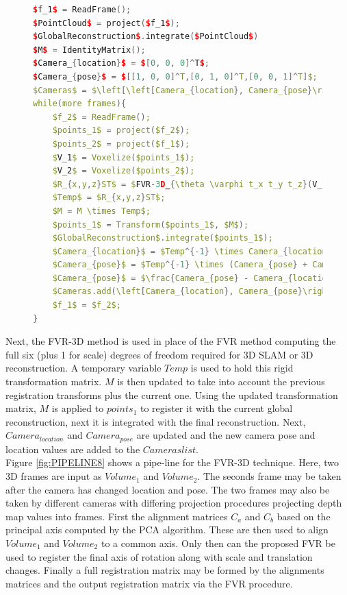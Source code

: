 \begin{figure}
\begin{lstlisting}[language=c++,caption=Phase Correlation Based SLAM Algorithm,label=algorithm:FVR3DSLAM,mathescape,basicstyle=\ttfamily]
$f_1$ = ReadFrame();
$PointCloud$ = project($f_1$);
$GlobalReconstruction$.integrate($PointCloud$)
$M$ = IdentityMatrix();
$Camera_{location}$ = $[0, 0, 0]^T$;
$Camera_{pose}$ = $[[1, 0, 0]^T,[0, 1, 0]^T,[0, 0, 1]^T]$;
$Cameras$ = $\left[\left[Camera_{location}, Camera_{pose}\right] \right]$;
while(more frames){
	$f_2$ = ReadFrame();
	$points_1$ = project($f_2$);
	$points_2$ = project($f_1$);
	$V_1$ = Voxelize($points_1$);
	$V_2$ = Voxelize($points_2$);
	$R_{x,y,z}ST$ = $FVR-3D_{\theta \varphi t_x t_y t_z}(V_1, V_2)$;
	$Temp$ = $R_{x,y,z}ST$;
	$M = M \times Temp$;
	$points_1$ = Transform($points_1$, $M$);
	$GlobalReconstruction$.integrate($points_1$);
	$Camera_{location}$ = $Temp^{-1} \times Camera_{location}$;
	$Camera_{pose}$ = $Temp^{-1} \times (Camera_{pose} + Camera_{location})$;
	$Camera_{pose}$ = $\frac{Camera_{pose} - Camera_{location}}{Camera_{pose} - Camera_{location}}$;
	$Cameras.add(\left[Camera_{location}, Camera_{pose}\right])$;
	$f_1$ = $f_2$;
}
\end{lstlisting}
\end{figure}

Next, the FVR-3D method is used in place of the FVR method computing the full six (plus 1 for scale) degrees of freedom required for 3D SLAM or 3D reconstruction. A temporary variable $Temp$ is used to hold this rigid transformation matrix. $M$ is then updated to take into account the previous registration transforms plus the current one. Using the updated transformation matrix, $M$ is applied to $points_1$ to register it with the current global reconstruction, next it is integrated with the final reconstruction. Next, $Camera_{location}$ and $Camera_{pose}$ are updated and the new camera pose and location values are added to the $Cameras list$. \\



Figure \ref{fig:PIPELINE8} shows a pipe-line for the FVR-3D technique. Here, two 3D frames are input as $Volume_1$ and $Volume_2$. The seconds frame may be taken after the camera has changed location and pose. The two frames may also be taken by different cameras with differing projection procedures projecting depth map values into frames. First the alignment matrices $C_a$ and $C_b$ based on the principal axis computed by the PCA algorithm. These are then used to align $Volume_1$ and $Volume_2$ to a common axis. Only then can the proposed FVR be used to register the final axis of rotation along with scale and translation changes. Finally a full registration matrix may be formed by the alignments matrices and the output registration matrix via the FVR procedure. \\

